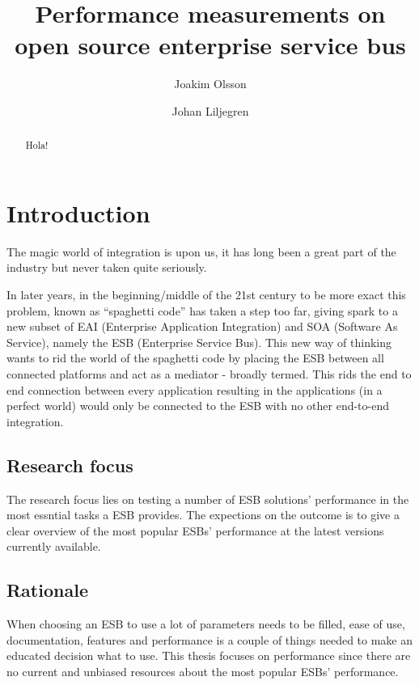 \documentclass{llncs}
\title{Performance measurements on open source enterprise service bus}
\author{Joakim Olsson \inst{1} \and Johan Liljegren\inst{1}}
\institute{
	Blekinge Institute of Technology \\
	\email{laggmonkei@gmail.com}, \email{datanizze@gmail.com}
}
\begin{document}
\maketitle
\begin{abstract}
Hola!
\end{abstract}

\section{Introduction} %
The magic world of integration is upon us, it has long been a great part of the industry but never taken quite seriously.

In later years, in the beginning/middle of the 21st century to be more exact this problem, known as ``spaghetti code'' has taken a step too far, giving spark to a new subset of EAI (Enterprise Application Integration) and SOA  (Software As Service), namely the ESB (Enterprise Service Bus).
This new way of thinking wants to rid the world of the spaghetti code by placing the ESB between all connected platforms and act as a mediator - broadly termed. 
This rids the end to end connection between every application resulting in the applications (in a perfect world) would only be connected to the ESB with no other end-to-end integration.

\subsection{Research focus}
The research focus lies on testing a number of ESB solutions' performance in the most essntial tasks a ESB provides. The expections on the outcome is to give a clear overview of the most popular ESBs' performance at the latest versions currently available.

\subsection{Rationale}
When choosing an ESB to use a lot of parameters needs to be filled, ease of use, documentation, features and performance is a couple of things needed to make an educated decision what to use. This thesis focuses on performance since there are no current and unbiased resources about the most popular ESBs' performance.
\end{document}
